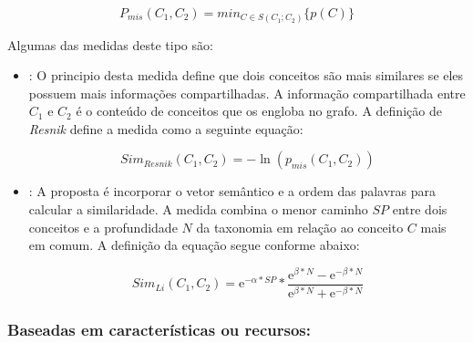 	\begin{equation}
		P_{mis}(C_1, C_2) = min_{C \in S(C_1;C_2)} \{p(C)\}
	\label{eq:mis}
	\end{equation}

Algumas das medidas deste tipo são:

\begin{itemize}

	\item{\textbf{\cite{Resnik:1999}}: O principio desta medida define que dois conceitos são mais similares se eles possuem mais informações compartilhadas. A informação compartilhada entre $C_1$ e $C_2$ é o conteúdo de conceitos que os engloba no grafo. A definição de \textit{Resnik} define a medida como a seguinte equação:
	
	\begin{equation}
		Sim_{Resnik}(C_1, C_2) = - \ln (p_{mis}(C_1, C_2))
	\label{eq:resnik}
	\end{equation}}
	
	\item{\textbf{\cite{Lin1993PrincipleBasedPW}}: A proposta é incorporar o vetor semântico e a ordem das palavras para calcular a similaridade. A medida combina o menor caminho $SP$ entre dois conceitos e a profundidade $N$ da taxonomia em relação ao conceito $C$ mais em comum. A definição da equação segue conforme abaixo:

	\begin{equation}
		Sim_{Li}(C_1, C_2) = \mathrm{e}^{-\alpha * SP} * \frac{ \mathrm{e}^{\beta * N} - \mathrm{e}^{- \beta * N} }{ \mathrm{e}^{\beta * N} + \mathrm{e}^{- \beta * N} }
	\label{eq:li}
	\end{equation}}
	
\end{itemize}

\subsubsection{Baseadas em características ou recursos:}

